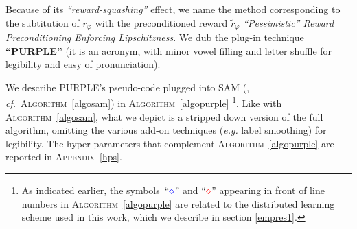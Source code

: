 Because of its \textit{``reward-squashing''} effect,
we name the method corresponding to the subtitution of $r_\varphi$ with
the preconditioned reward $\tilde{r}_\varphi$
\emph{``Pessimistic'' Reward Preconditioning Enforcing Lipschitzness}.
We dub the plug-in technique \textbf{``PURPLE''}
(it is an acronym, with minor vowel filling and letter shuffle for legibility and
easy of pronunciation).

We describe PURPLE's pseudo-code plugged into
SAM (\cite{Blonde2019-vc}, \textit{cf.}~\textsc{Algorithm}~\ref{algosam})
in \textsc{Algorithm}~\ref{algopurple}
\footnote{As indicated earlier, the symbols~``$\textcolor{blue}{\diamond}$''
and ``$\textcolor{red}{\diamond}$'' appearing
in front of line numbers in \textsc{Algorithm}~\ref{algopurple}
are related to the distributed learning scheme
used in this work, which we describe in section \ref{empres1}.}.
Like with \textsc{Algorithm}~\ref{algosam}, what we depict is a stripped down version of the full algorithm,
omitting the various add-on techniques (\textit{e.g.} label smoothing)
for legibility.
The hyper-parameters that complement \textsc{Algorithm}~\ref{algopurple}
are reported in \textsc{Appendix}~\ref{hps}.


